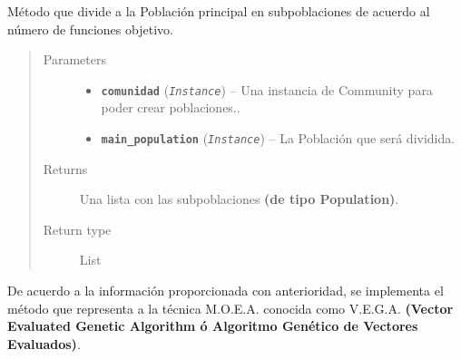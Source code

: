 \documentclass[letterpaper,10pt,english]{sphinxmanual}
\begin{document}
\begin{fulllineitems}
\label{Model/MOEA/VEGA:Model.MOEA.VEGA.create_subpopulations}
Método que divide a la Población principal en subpoblaciones
de acuerdo al número de funciones objetivo.
\begin{quote}\begin{description}
\item[{Parameters}] \leavevmode\begin{itemize}
\item {} 
\textbf{\texttt{comunidad}} (\emph{\texttt{Instance}}) -- Una instancia de Community para poder crear
poblaciones..

\item {} 
\textbf{\texttt{main\_population}} (\emph{\texttt{Instance}}) -- La Población que será dividida.

\end{itemize}

\item[{Returns}] \leavevmode
Una lista con las subpoblaciones \textbf{(de tipo Population)}.

\item[{Return type}] \leavevmode
List

\end{description}\end{quote}

\end{fulllineitems}


\begin{fulllineitems}
\label{Model/MOEA/VEGA:Model.MOEA.VEGA.execute_moea}
De acuerdo a la información proporcionada con anterioridad, se 
implementa el método que representa a la técnica M.O.E.A. conocida 
como V.E.G.A. \textbf{(Vector Evaluated Genetic Algorithm ó Algoritmo 
Genético de Vectores Evaluados)}.

\end{fulllineitems}
\end{document}

